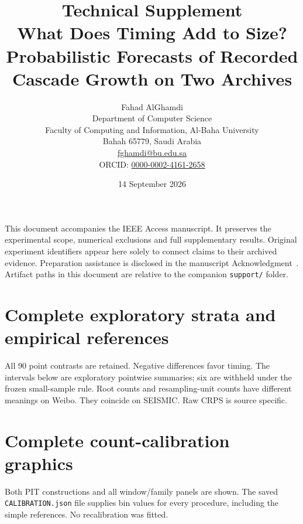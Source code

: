 \documentclass[10pt,a4paper]{article}
\title{Technical Supplement\\\large What Does Timing Add to Size?\\Probabilistic Forecasts of Recorded Cascade Growth on Two Archives}
\author{Fahad AlGhamdi\\\small Department of Computer Science\\\small Faculty of Computing and Information, Al-Baha University\\\small Bahah 65779, Saudi Arabia\\\small \href{mailto:fghamdi@bu.edu.sa}{fghamdi@bu.edu.sa}\\\small ORCID: \href{https://orcid.org/0000-0002-4161-2658}{0000-0002-4161-2658}}
\date{14 September 2026}
\begin{document}
\maketitle
\noindent This document accompanies the IEEE Access manuscript. It preserves the experimental scope, numerical exclusions and full supplementary results. Original experiment identifiers appear here solely to connect claims to their archived evidence. Preparation assistance is disclosed in the manuscript Acknowledgment~\cite{openai2026}. Artifact paths in this document are relative to the companion \texttt{support/} folder.
\makeatletter
\renewcommand{\l@section}{\@dottedtocline{1}{0em}{2.8em}}
\renewcommand{\l@subsection}{\@dottedtocline{2}{2.8em}{3.8em}}
\makeatother
\tableofcontents\clearpage

\clearpage\section{Complete exploratory strata and empirical references}
All 90 point contrasts are retained. Negative differences favor timing. The intervals below are exploratory pointwise summaries; six are withheld under the frozen small-sample rule. Root counts and resampling-unit counts have different meanings on Weibo. They coincide on SEISMIC. Raw CRPS is source specific.

\clearpage\section{Complete count-calibration graphics}
Both PIT constructions and all window/family panels are shown. The saved \texttt{CALIBRATION.json} file supplies bin values for every procedure, including the simple references. No recalibration was fitted.

\clearpage
\end{document}

